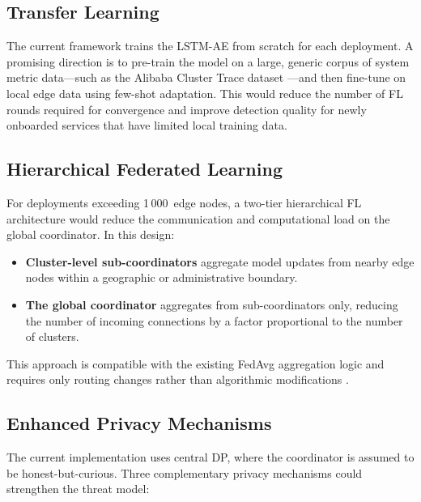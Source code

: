 \subsection{Transfer Learning}
\label{subsec:future_transfer_learning}

The current framework trains the LSTM-AE from scratch for each deployment.
A promising direction is to pre-train the model on a large, generic corpus of
system metric data---such as the Alibaba Cluster Trace
dataset \cite{zhang2019tracing}---and then fine-tune on local edge data using
few-shot adaptation. This would reduce the number of FL rounds required for
convergence and improve detection quality for newly onboarded services that
have limited local training data.

\subsection{Hierarchical Federated Learning}
\label{subsec:future_hierarchical_fl}

For deployments exceeding 1\,000~edge nodes, a two-tier hierarchical FL
architecture would reduce the communication and computational load on the
global coordinator. In this design:

\begin{itemize}
    \item \textbf{Cluster-level sub-coordinators} aggregate model updates from
    nearby edge nodes within a geographic or administrative boundary.
    \item \textbf{The global coordinator} aggregates from sub-coordinators
    only, reducing the number of incoming connections by a factor proportional
    to the number of clusters.
\end{itemize}

This approach is compatible with the existing FedAvg aggregation logic and
requires only routing changes rather than algorithmic modifications
\cite{kairouz2021advances}.

\subsection{Enhanced Privacy Mechanisms}
\label{subsec:future_privacy}

The current implementation uses central DP, where the coordinator is assumed
to be honest-but-curious. Three complementary privacy mechanisms could
strengthen the threat model:


